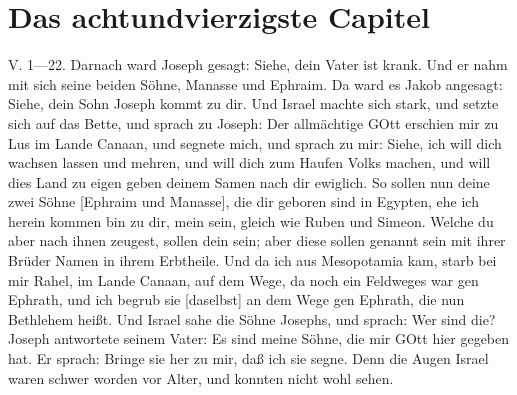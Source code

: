 \section{Das achtundvierzigste Capitel}

\begin{schriftzitat}
V. 1—22. Darnach ward Joseph gesagt: Siehe, dein Vater ist krank. Und er nahm mit sich seine beiden Söhne, Manasse und Ephraim. Da ward es Jakob angesagt: Siehe, dein Sohn Joseph kommt zu dir. Und Israel machte sich stark, und setzte sich auf das Bette, und sprach zu Joseph: Der allmächtige GOtt erschien mir zu Lus im Lande Canaan, und segnete mich, und sprach zu mir: Siehe, ich will dich wachsen lassen und mehren, und will dich zum Haufen Volks machen, und will dies Land zu eigen geben deinem Samen nach dir ewiglich. So sollen nun deine zwei Söhne [Ephraim und Manasse], die dir geboren sind in Egypten, ehe ich herein kommen bin zu dir, mein sein, gleich wie Ruben und Simeon. Welche du aber nach ihnen zeugest, sollen dein sein; aber diese sollen genannt sein mit ihrer Brüder Namen in ihrem Erbtheile. Und da ich aus Mesopotamia kam, starb bei mir Rahel, im Lande Canaan, auf dem Wege, da noch ein Feldweges war gen Ephrath, und ich begrub sie [daselbst] an dem Wege gen Ephrath, die nun Bethlehem heißt. Und Israel sahe die Söhne Josephs, und sprach: Wer sind die? Joseph antwortete seinem Vater: Es sind meine Söhne, die mir GOtt hier gegeben hat. Er sprach: Bringe sie her zu mir, daß ich sie segne. Denn die Augen Israel waren schwer worden vor Alter, und konnten nicht wohl sehen.

\end{schriftzitat}
